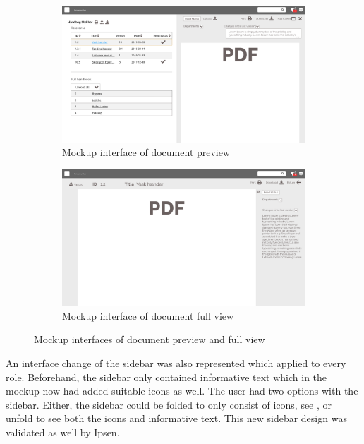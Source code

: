 \documentclass[../../master.tex]{subfiles}
\begin{document}
\begin{figure}[H]
	\centering
	\begin{subfigure}[b]{0.48\textwidth}
		\includegraphics[width=\textwidth]{billeder/PreviewVersion.jpg}
		\caption{Mockup interface of document preview}
	\end{subfigure}
	\quad
	\begin{subfigure}[b]{0.48\textwidth}
		\includegraphics[width=\textwidth]{billeder/FullView.jpg}
		\caption{Mockup interface of document full view}
	\end{subfigure}
	\caption{Mockup interfaces of document preview and full view}\label{fig:mockupPreview}
\end{figure}

An interface change of the sidebar was also represented which applied to every role.
Beforehand, the sidebar only contained informative text which in the mockup now had added suitable icons as well.
The user had two options with the sidebar.
Either, the sidebar could be folded to only consist of icons, see , or unfold to see both the icons and informative text.
This new sidebar design was validated as well by Ipsen.
\end{document}
